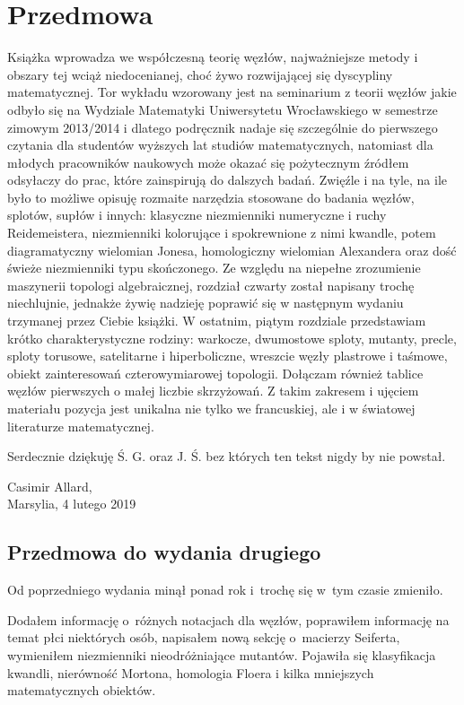 \chapter*{Przedmowa}
Książka wprowadza we współczesną teorię węzłów, najważniejsze metody i obszary tej wciąż niedocenianej, choć żywo rozwijającej się dyscypliny matematycznej.
Tor wykładu wzorowany jest na seminarium z teorii węzłów jakie odbyło się na Wydziale Matematyki Uniwersytetu Wrocławskiego w semestrze zimowym 2013/2014 i dlatego podręcznik nadaje się szczególnie do pierwszego czytania dla studentów wyższych lat studiów matematycznych, natomiast dla młodych pracowników naukowych może okazać się pożytecznym źródłem odsyłaczy do prac, które zainspirują do dalszych badań.
Zwięźle i na tyle, na ile było to możliwe opisuję rozmaite narzędzia stosowane do badania węzłów, splotów, supłów i innych: klasyczne niezmienniki numeryczne i ruchy Reidemeistera, niezmienniki kolorujące i spokrewnione z nimi kwandle, potem diagramatyczny wielomian Jonesa, homologiczny wielomian Alexandera oraz dość świeże niezmienniki typu skończonego.
Ze względu na niepełne zrozumienie maszynerii topologi algebraicznej, rozdział czwarty został napisany trochę niechlujnie, jednakże żywię nadzieję poprawić się w następnym wydaniu trzymanej przez Ciebie książki.
W ostatnim, piątym rozdziale przedstawiam krótko charakterystyczne rodziny: warkocze, dwumostowe sploty, mutanty, precle, sploty torusowe, satelitarne i hiperboliczne, wreszcie węzły plastrowe i taśmowe, obiekt zainteresowań czterowymiarowej topologii.
Dołączam również tablice węzłów pierwszych o małej liczbie skrzyżowań.
Z takim zakresem i ujęciem materiału pozycja jest unikalna nie tylko we francuskiej, ale i w światowej literaturze matematycznej.

Serdecznie dziękuję Ś. G. oraz J. Ś. bez których ten tekst nigdy by nie powstał.\\${}$

\begin{flushright}
Casimir Allard,\\Marsylia, 4 lutego 2019
\end{flushright}

\section*{Przedmowa do wydania drugiego}
Od poprzedniego wydania minął ponad rok i~trochę się w~tym czasie zmieniło.

Dodałem informację o~różnych notacjach dla węzłów, poprawiłem informację na temat płci niektórych osób, napisałem nową sekcję o~macierzy Seiferta, wymieniłem niezmienniki nieodróżniające mutantów.
Pojawiła się klasyfikacja kwandli, nierówność Mortona, homologia Floera i kilka mniejszych matematycznych obiektów.

